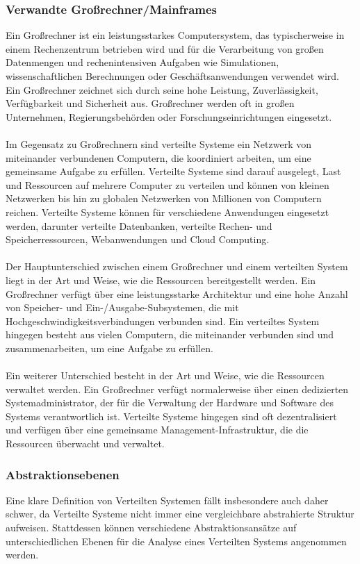 \documentclass[../vs-script-first-v01.tex]{subfiles}
\begin{document}
\subsubsection{Verwandte Großrechner/Mainframes}
Ein Großrechner ist ein leistungsstarkes Computersystem, das typischerweise in einem Rechenzentrum betrieben wird und für die Verarbeitung von großen Datenmengen und rechenintensiven Aufgaben wie Simulationen, wissenschaftlichen Berechnungen oder Geschäftsanwendungen verwendet wird. Ein Großrechner zeichnet sich durch seine hohe Leistung, Zuverlässigkeit, Verfügbarkeit und Sicherheit aus. Großrechner werden oft in großen Unternehmen, Regierungsbehörden oder Forschungseinrichtungen eingesetzt.
\\\\
Im Gegensatz zu Großrechnern sind verteilte Systeme ein Netzwerk von miteinander verbundenen Computern, die koordiniert arbeiten, um eine gemeinsame Aufgabe zu erfüllen. Verteilte Systeme sind darauf ausgelegt, Last und Ressourcen auf mehrere Computer zu verteilen und können von kleinen Netzwerken bis hin zu globalen Netzwerken von Millionen von Computern reichen. Verteilte Systeme können für verschiedene Anwendungen eingesetzt werden, darunter verteilte Datenbanken, verteilte Rechen- und Speicherressourcen, Webanwendungen und Cloud Computing.
\\\\
Der Hauptunterschied zwischen einem Großrechner und einem verteilten System liegt in der Art und Weise, wie die Ressourcen bereitgestellt werden. Ein Großrechner verfügt über eine leistungsstarke Architektur und eine hohe Anzahl von Speicher- und Ein-/Ausgabe-Subsystemen, die mit Hochgeschwindigkeitsverbindungen verbunden sind. Ein verteiltes System hingegen besteht aus vielen Computern, die miteinander verbunden sind und zusammenarbeiten, um eine Aufgabe zu erfüllen.
\\\\
Ein weiterer Unterschied besteht in der Art und Weise, wie die Ressourcen verwaltet werden. Ein Großrechner verfügt normalerweise über einen dedizierten Systemadministrator, der für die Verwaltung der Hardware und Software des Systems verantwortlich ist. Verteilte Systeme hingegen sind oft dezentralisiert und verfügen über eine gemeinsame Management-Infrastruktur, die die Ressourcen überwacht und verwaltet.

\subsubsection{Abstraktionsebenen}
Eine klare Definition von Verteilten Systemen fällt insbesondere auch daher schwer, da Verteilte Systeme nicht immer eine vergleichbare abstrahierte Struktur aufweisen. Stattdessen können verschiedene Abstraktionsansätze auf unterschiedlichen Ebenen für die Analyse eines Verteilten Systems angenommen werden. 
\end{document}

